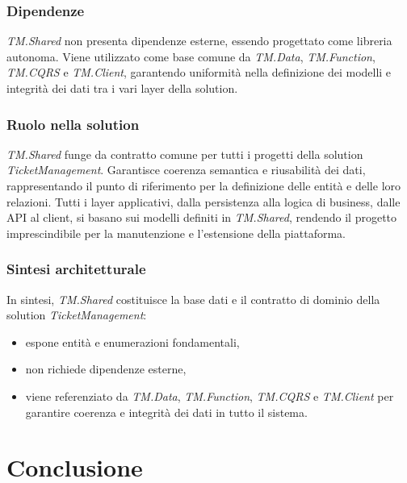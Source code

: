 \subsubsection{Dipendenze}

\textit{TM.Shared} non presenta dipendenze esterne, essendo progettato come libreria autonoma. Viene utilizzato come base comune da \textit{TM.Data}, \textit{TM.Function}, \textit{TM.CQRS} e \textit{TM.Client}, garantendo uniformità nella definizione dei modelli e integrità dei dati tra i vari layer della solution.

\subsubsection{Ruolo nella solution}

\textit{TM.Shared} funge da contratto comune per tutti i progetti della solution \textit{TicketManagement}. Garantisce coerenza semantica e riusabilità dei dati, rappresentando il punto di riferimento per la definizione delle entità e delle loro relazioni. Tutti i layer applicativi, dalla persistenza alla logica di business, dalle API al client, si basano sui modelli definiti in \textit{TM.Shared}, rendendo il progetto imprescindibile per la manutenzione e l'estensione della piattaforma.

\subsubsection{Sintesi architetturale}

In sintesi, \textit{TM.Shared} costituisce la base dati e il contratto di dominio della solution \textit{TicketManagement}:
\begin{itemize}
\item espone entità e enumerazioni fondamentali,

\item non richiede dipendenze esterne,

\item viene referenziato da \textit{TM.Data}, \textit{TM.Function}, \textit{TM.CQRS} e \textit{TM.Client} per garantire coerenza e integrità dei dati in tutto il sistema.
\end{itemize}

\section{Conclusione}

